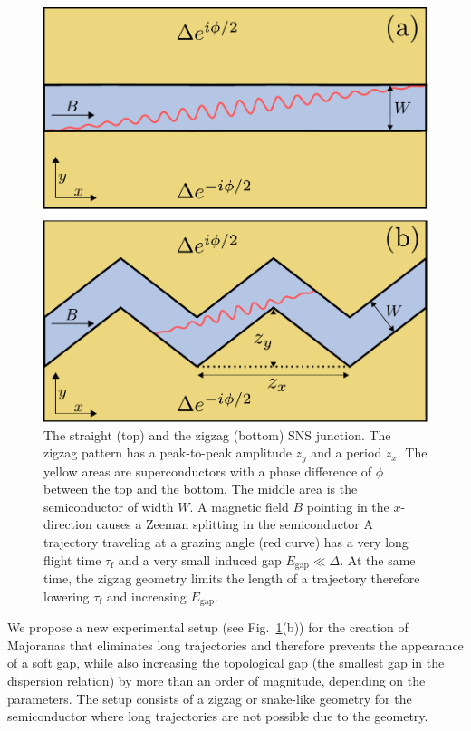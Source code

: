 \documentclass[english, twocolumn, 10pt, aps, superscriptaddress, floatfix, prb, citeautoscript]{revtex4-1}
\renewcommand{\comment}[2]{#2}
\begin{document}
\begin{figure}[!htb]
\centering
\includegraphics[width=0.9\columnwidth]{figures/zigzag.pdf}
\caption{The straight (top) and the zigzag (bottom) SNS junction.
The zigzag pattern has a peak-to-peak amplitude $z_y$ and a period $z_x$.
The yellow areas are superconductors with a phase difference of $\phi$ between the top and the bottom.
The middle area is the semiconductor of width $W$.
A magnetic field $B$ pointing in the $x$-direction causes a Zeeman splitting in the semiconductor
A trajectory traveling at a grazing angle (red curve) has a very long flight time $\tau_\textrm{f}$ and a very small induced gap $E_\textrm{gap} \ll \Delta$.
At the same time, the zigzag geometry limits the length of a trajectory therefore lowering $\tau_\textrm{f}$ and increasing $E_\textrm{gap}$.
\label{fig:setup}}
\end{figure}

\comment{We show that zigzag geometry solves this problem by eliminating the long trajectories.}
We propose a new experimental setup (see Fig.~\ref{fig:setup}(b)) for the creation of Majoranas that eliminates long trajectories and therefore prevents the appearance of a soft gap, while also increasing the topological gap (the smallest gap in the dispersion relation) by more than an order of magnitude, depending on the parameters.
The setup consists of a zigzag or snake-like geometry for the semiconductor where long trajectories are not possible due to the geometry.
\end{document}
